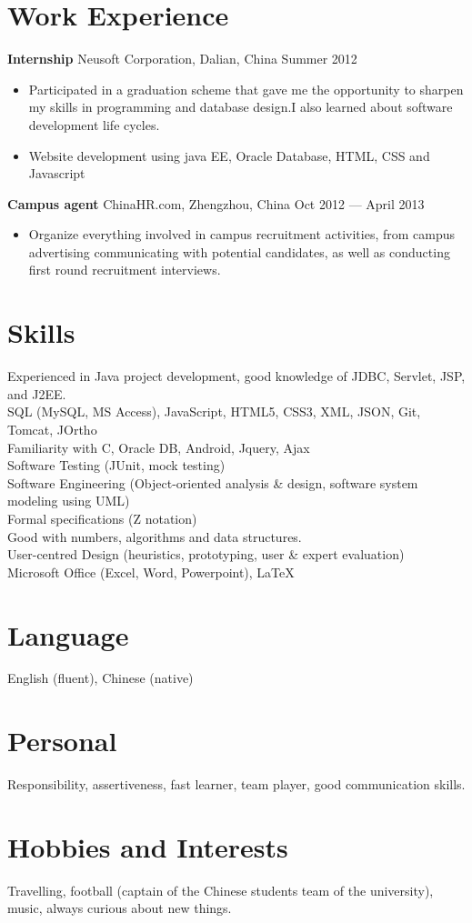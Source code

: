 \documentclass[margin]{res}
\begin{document}
\begin{resume}
\section{Work Experience}
 {\bf Internship } Neusoft Corporation, Dalian, China \hfill Summer  2012
 \begin{itemize} \itemsep -2pt  %
  \item Participated in a graduation scheme that gave me the opportunity to
  sharpen my skills in programming and database design.I also learned about
  software development life cycles.
 \item Website development using java EE, Oracle Database, HTML, CSS and
 Javascript
 \end{itemize} 
{\bf Campus agent} ChinaHR.com, Zhengzhou, China \hfill  Oct 2012 --- April 2013
\begin{itemize} \itemsep -2pt %
\item Organize everything involved in campus recruitment activities, from campus
advertising communicating with potential candidates, as well as conducting first round recruitment interviews.
\end{itemize}
\section{Skills}
 Experienced in Java project development, good knowledge of JDBC, Servlet, JSP,
 and J2EE.\\
SQL (MySQL, MS Access), JavaScript, HTML5, CSS3, XML, JSON, Git, Tomcat, JOrtho\\
Familiarity with C, Oracle DB, Android, Jquery, Ajax\\
Software Testing (JUnit, mock testing)\\
Software Engineering (Object-oriented analysis \& design, software system
modeling using UML)\\
Formal specifications (Z notation)\\ 
Good with numbers, algorithms and data structures.\\
User-centred Design (heuristics, prototyping, user \& expert evaluation)\\
Microsoft Office (Excel, Word, Powerpoint), \LaTeX
\section{Language} English (fluent), Chinese (native)
\section{Personal} Responsibility, assertiveness, fast learner, team player,
good communication skills.
\section{Hobbies and Interests}
Travelling, football (captain of the Chinese students team of
the university), music, always curious about new things.
\end{resume} 
\end{document}
